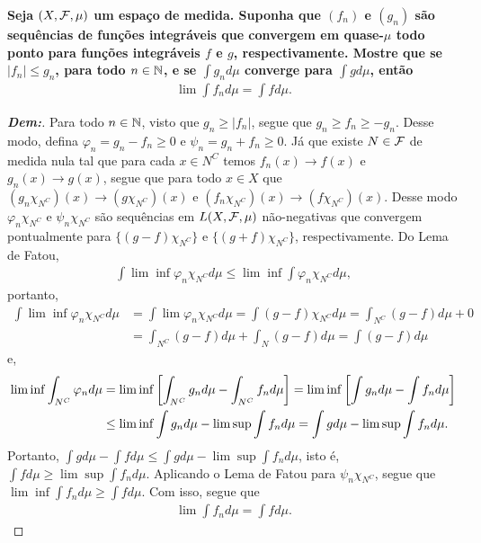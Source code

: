 \textbf{Seja $(X, \mathcal F, \mu)$ um espaço de medida. Suponha que $(f_n)$ 
e $(g_n)$ são sequências de funções integráveis que convergem em quase-$\mu$ todo ponto 
para funções integráveis $f$ e $g$, respectivamente. Mostre que se $|f_n| \le g_n$, para 
todo $n \in \mathbb N$, e se $\int g_n d\mu$ converge para $\int g d\mu$, então 
\begin{align*}
  \lim \int f_n d\mu = \int f d\mu.
\end{align*}}
\begin{proof}[\textbf{Dem:}] Para todo $n \in \mathbb N$, visto que $g_n \ge |f_n|$,
  segue que $g_n \ge f_n \ge -g_n$. Desse modo, defina $\varphi_n = g_n - f_n \ge 0$
  e $\psi_n = g_n + f_n \ge 0$. Já que existe $N \in \mathcal F$ de medida nula 
  tal que para cada $x \in N^C$ temos $f_n(x) \rightarrow f(x)$
  e $g_n(x) \rightarrow g(x)$, segue que para todo 
  $x \in X$ que $(g_n\chi_{N^C})(x) \rightarrow (g\chi_{N^C})(x)$ e 
  $(f_n\chi_{N^C})(x) \rightarrow (f\chi_{N^C})(x)$. Desse modo $\varphi_n\chi_{N^C}$ 
  e $\psi_n\chi_{N^C}$ são sequências em $L(X, \mathcal F, \mu)$ não-negativas que 
  convergem pontualmente para $\{(g - f)\chi_{N^C}\}$ e $\{(g + f)\chi_{N^C}\}$, 
  respectivamente. Do Lema de Fatou, 
  \begin{align*}
    \int \lim\inf \varphi_n\chi_{N^C} d\mu \le \lim \inf \int \varphi_n\chi_{N^C} d\mu,
  \end{align*}
  portanto, 
  \begin{align*}
    \int \lim \inf \varphi_n\chi_{N^C} d\mu &= \int \lim \varphi_n\chi_{N^C} d\mu 
    = \int (g - f)\chi_{N^C} d\mu
    = \int_{N^C} (g-f)d\mu + 0\\
    &= \int_{N^C} (g-f)d\mu + \int_{N} (g-f) d\mu 
    = \int (g-f)d\mu
  \end{align*}
  e, 
  \begin{align*}
    \lim \inf \int_{N^C} \varphi_n d\mu 
    &= \lim \inf \left[\int_{N^C} g_n d\mu - \int_{N^C} f_n d\mu\right] 
    = \lim \inf  \left[\int g_n d\mu - \int f_n d\mu\right]\\
    &\le \lim\inf \int g_n d\mu - \lim\sup \int f_n d\mu 
    = \int g d\mu - \lim\sup \int f_n d\mu.
  \end{align*}
  Portanto, $\int g d\mu - \int f d\mu \le \int gd\mu - \lim\sup\int f_n d\mu$, 
  isto é, $\int f d\mu \ge \lim\sup \int f_n d\mu$. Aplicando o Lema de Fatou para 
  $\psi_n\chi_{N^C}$, segue que $\lim\inf \int f_n d\mu \ge \int f d\mu$. Com isso, 
  segue que 
  \begin{align*}
    \lim \int f_n d\mu = \int f d\mu.
  \end{align*}
\end{proof}

